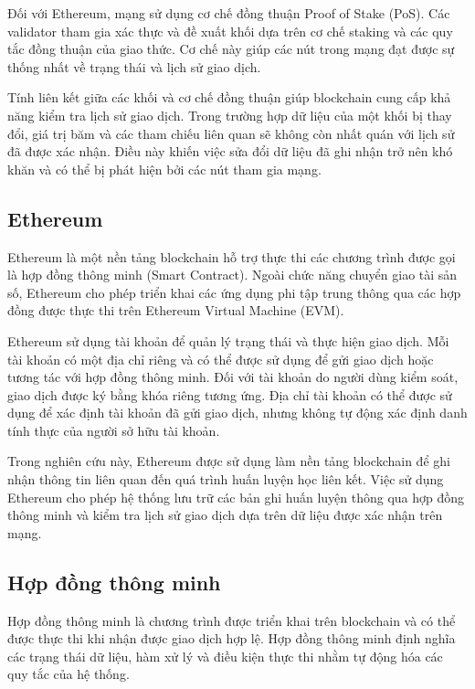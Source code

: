 Đối với Ethereum, mạng sử dụng cơ chế đồng thuận Proof of Stake (PoS). Các validator tham gia xác thực và đề xuất khối dựa trên cơ chế staking và các quy tắc đồng thuận của giao thức. Cơ chế này giúp các nút trong mạng đạt được sự thống nhất về trạng thái và lịch sử giao dịch.

Tính liên kết giữa các khối và cơ chế đồng thuận giúp blockchain cung cấp khả năng kiểm tra lịch sử
giao dịch. Trong trường hợp dữ liệu của một khối bị thay đổi, giá trị băm và các tham chiếu liên
quan sẽ không còn nhất quán với lịch sử đã được xác nhận. Điều này khiến việc sửa đổi dữ liệu đã
ghi nhận trở nên khó khăn và có thể bị phát hiện bởi các nút tham gia mạng.

\subsection{Ethereum}

Ethereum là một nền tảng blockchain hỗ trợ thực thi các chương trình được gọi là hợp đồng thông
minh (Smart Contract). Ngoài chức năng chuyển giao tài sản số, Ethereum cho phép triển khai các ứng
dụng phi tập trung thông qua các hợp đồng được thực thi trên Ethereum Virtual Machine (EVM).

Ethereum sử dụng tài khoản để quản lý trạng thái và thực hiện giao dịch. Mỗi tài khoản có một địa
chỉ riêng và có thể được sử dụng để gửi giao dịch hoặc tương tác với hợp đồng thông minh. Đối với
tài khoản do người dùng kiểm soát, giao dịch được ký bằng khóa riêng tương ứng. Địa chỉ tài khoản
có thể được sử dụng để xác định tài khoản đã gửi giao dịch, nhưng không tự động xác định danh tính
thực của người sở hữu tài khoản.

Trong nghiên cứu này, Ethereum được sử dụng làm nền tảng blockchain để ghi nhận thông tin liên quan
đến quá trình huấn luyện học liên kết. Việc sử dụng Ethereum cho phép hệ thống lưu trữ các bản ghi
huấn luyện thông qua hợp đồng thông minh và kiểm tra lịch sử giao dịch dựa trên dữ liệu được xác
nhận trên mạng.

\subsection{Hợp đồng thông minh}

Hợp đồng thông minh là chương trình được triển khai trên blockchain và có thể được thực thi khi
nhận được giao dịch hợp lệ. Hợp đồng thông minh định nghĩa các trạng thái dữ liệu, hàm xử lý và
điều kiện thực thi nhằm tự động hóa các quy tắc của hệ thống.

